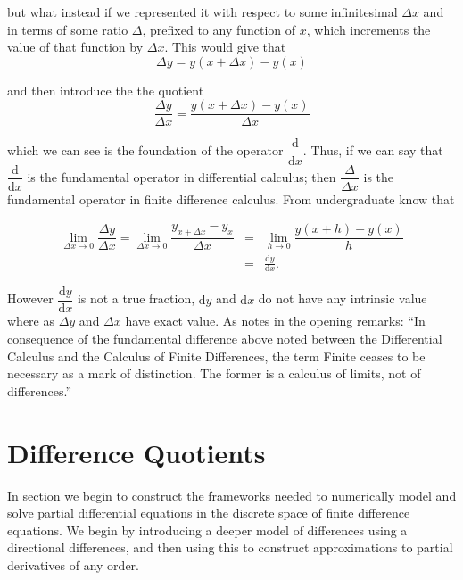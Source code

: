 \documentclass[../main.tex]{subfiles}
\begin{document}
  but what instead if we represented it with respect to some infinitesimal $\Delta x$ and in terms of some ratio $\Delta$, prefixed to any function of $x$, which increments the value of that function by $\Delta x$. This would give that \\

  \begin{equation}
    \Delta y = y(x + \Delta x) - y(x)
  \end{equation}

  and then introduce the the quotient \\

  \begin{equation}
    \dfrac{\Delta y}{\Delta x} = \dfrac{y(x + \Delta x) - y(x)}{\Delta x}
  \end{equation}

  which we can see is the foundation of the operator $\dfrac{\mathrm{d}}{\mathrm{d}x}$. Thus, if we can say that $\dfrac{\mathrm{d}}{\mathrm{d}x}$ is the fundamental operator in differential calculus; then $\dfrac{\Delta}{\Delta x}$ is the fundamental operator in finite difference calculus. From undergraduate know that

  \begin{eqnarray}
    \lim_{\Delta x \to 0} \dfrac{\Delta y}{\Delta x}
    = \lim_{\Delta x \to 0} \dfrac{y_{x + \Delta x} - y_x}{\Delta x}
    &=& \lim_{h \to 0} \dfrac{y(x+h) - y(x)}{h} \nonumber \\
    &=& \frac{\mathrm{d} y}{\mathrm{d}x}.
  \end{eqnarray}

  However $\dfrac{\mathrm{d} y}{\mathrm{d}x}$ is not a true fraction, $\mathrm{d}y$ and $\mathrm{d}x$ do not have any intrinsic value where as $\Delta y$ and $\Delta x$ have exact value. As \cite{boole1880} notes in the opening remarks: ``In consequence of the fundamental difference above noted between the Differential Calculus and the Calculus of Finite Differences, the term Finite ceases to be necessary as a mark of distinction. The former is a calculus of limits, not of differences.''

  \section{Difference Quotients}\label{sec:fdes:quotients}
  In section we begin to construct the frameworks needed to numerically model and solve partial differential equations in the discrete space of finite difference equations. We begin by introducing a deeper model of differences using a directional differences, and then using this to construct approximations to partial derivatives of any order.
\end{document}

